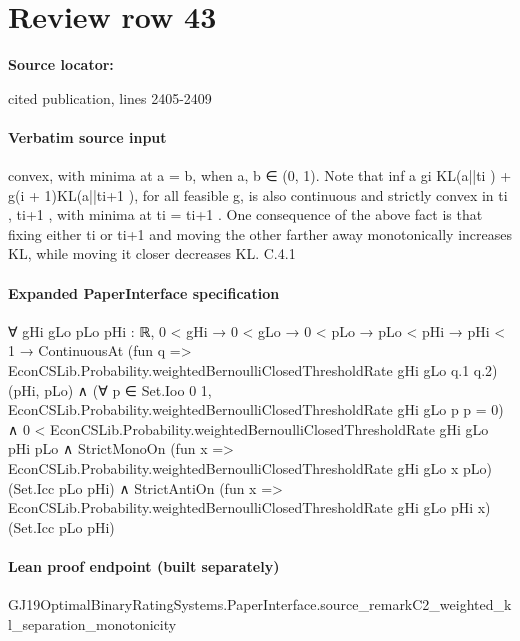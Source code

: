 \documentclass[10pt]{article}
\begin{document}
\section*{Review row 43}
\textbf{Source locator:} {\footnotesize\raggedright cited publication, lines 2405-\allowbreak{}2409\par}
\paragraph{Verbatim source input}
\begin{ReviewVerbatim}
convex, with minima at a = b, when a, b ∈ (0, 1). Note that inf a {gi KL(a||ti ) + g(i + 1)KL(a||ti+1 )},
for all feasible g, is also continuous and strictly convex in ti , ti+1 , with minima at ti = ti+1 .
One consequence of the above fact is that fixing either ti or ti+1 and moving the other farther
away monotonically increases KL, while moving it closer decreases KL.
C.4.1
\end{ReviewVerbatim}


\paragraph{Expanded PaperInterface specification}
\begin{ReviewVerbatim}
∀ {gHi gLo pLo pHi : ℝ},
  0 < gHi →
    0 < gLo →
      0 < pLo →
        pLo < pHi →
          pHi < 1 →
            ContinuousAt (fun q => EconCSLib.Probability.weightedBernoulliClosedThresholdRate gHi gLo q.1 q.2)
                (pHi, pLo) ∧
              (∀ p ∈ Set.Ioo 0 1, EconCSLib.Probability.weightedBernoulliClosedThresholdRate gHi gLo p p = 0) ∧
                0 < EconCSLib.Probability.weightedBernoulliClosedThresholdRate gHi gLo pHi pLo ∧
                  StrictMonoOn (fun x => EconCSLib.Probability.weightedBernoulliClosedThresholdRate gHi gLo x pLo)
                      (Set.Icc pLo pHi) ∧
                    StrictAntiOn (fun x => EconCSLib.Probability.weightedBernoulliClosedThresholdRate gHi gLo pHi x)
                      (Set.Icc pLo pHi)
\end{ReviewVerbatim}

\paragraph{Lean proof endpoint (built separately)}\begin{ReviewVerbatim}
GJ19OptimalBinaryRatingSystems.PaperInterface.source_remarkC2_weighted_kl_separation_monotonicity
\end{ReviewVerbatim}
\end{document}
